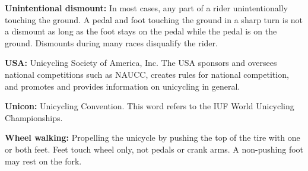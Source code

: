\textbf{Unintentional dismount:} In most cases, any part of a rider unintentionally touching the ground.
A pedal and foot touching the ground in a sharp turn is not a dismount as long as the foot stays on the pedal while the pedal is on the ground.
Dismounts during many races disqualify the rider.

\textbf{USA:} Unicycling Society of America, Inc.
The USA sponsors and oversees national competitions such as NAUCC, creates rules for national competition, and promotes and provides information on unicycling in general.

\textbf{Unicon:} Unicycling Convention.
This word refers to the IUF World Unicycling Championships.

\textbf{Wheel walking:} Propelling the unicycle by pushing the top of the tire with one or both feet.
Feet touch wheel only, not pedals or crank arms.
A non-pushing foot may rest on the fork.
